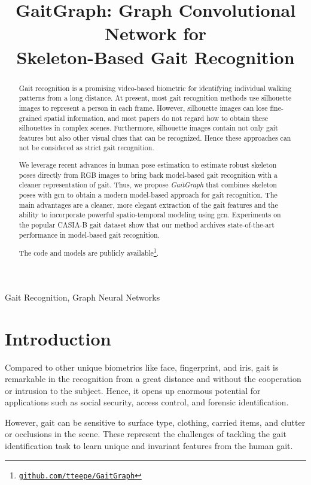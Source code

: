 \documentclass{article}
\title{GaitGraph: Graph Convolutional Network for \\Skeleton-Based Gait Recognition}
\begin{document}
\maketitle
\begin{abstract}
Gait recognition is a promising video-based biometric for identifying individual walking patterns from a long distance.
At present, most gait recognition methods use silhouette images to represent a person in each frame. However, silhouette images can lose fine-grained spatial information, and most papers do not regard how to obtain these silhouettes in complex scenes. Furthermore, silhouette images contain not only gait features but also other visual clues that can be recognized. Hence these approaches can not be considered as strict gait recognition.


We leverage recent advances in human pose estimation to estimate robust skeleton poses directly from RGB images to bring back model-based gait recognition with a cleaner representation of gait. Thus, we propose \textit{GaitGraph} that combines skeleton poses with \gls{gcn} to obtain a modern model-based approach for gait recognition. The main advantages are a cleaner, more elegant extraction of the gait features and the ability to incorporate powerful spatio-temporal modeling using \gls{gcn}.
Experiments on the popular CASIA-B gait dataset show that our method archives state-of-the-art performance in model-based gait recognition.

The code and models are publicly available\footnote{\href{https://github.com/tteepe/GaitGraph}{\tt github.com/tteepe/GaitGraph}}.


\end{abstract}
\begin{keywords}
Gait Recognition, Graph Neural Networks
\end{keywords}


\section{Introduction}
\label{sec:intro}
Compared to other unique biometrics like face, fingerprint, and iris, gait is remarkable in the recognition from a great distance and without the cooperation or intrusion to the subject. Hence, it opens up enormous potential for applications such as social security, access control, and forensic identification.

However, gait can be sensitive to surface type, clothing, carried items, and clutter or occlusions in the scene.
These represent the challenges of tackling the gait identification task to learn unique and invariant features from the human gait.
\end{document}
